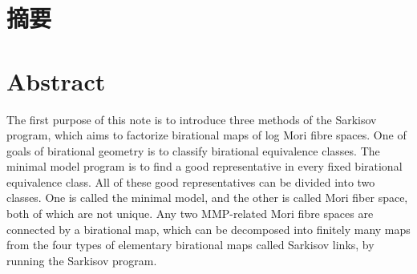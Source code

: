 

\maketitle%
\MAKETITLE%
\makedeclaration%
\intobmk\chapter*{摘\quad 要}%
\setcounter{page}{1}%


\intobmk\chapter*{Abstract}%

The first purpose of this note is to introduce three methods of the Sarkisov program, which aims to factorize birational maps of log Mori fibre spaces. 
One of goals of birational geometry is to classify birational equivalence classes. The minimal model program  is to find a good representative in every fixed birational equivalence class. 
All of these good representatives can be divided into two classes. One is called the minimal model, and the other is called Mori fiber space, both of  which are not unique. 
Any two MMP-related Mori fibre spaces are connected by a birational map, which can be decomposed into finitely many maps from the four types of elementary birational maps called Sarkisov links, by running the Sarkisov program. 


\cleardoublepage\pagestyle{frontmatterstyle}%

